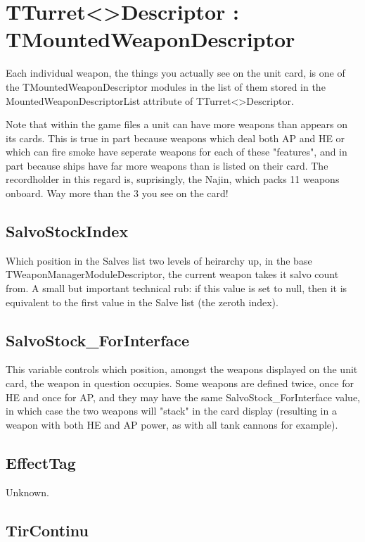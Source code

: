 \documentclass{article}
\begin{document}
\section{TTurret\textless *\textgreater Descriptor : TMountedWeaponDescriptor}

Each individual weapon, the things you actually see on the unit card, is one of the TMountedWeaponDescriptor modules in the list of them stored in the MountedWeaponDescriptorList attribute of TTurret\textless *\textgreater Descriptor.

Note that within the game files a unit can have more weapons than appears on its cards. This is true in part because weapons which deal both AP and HE or which can fire smoke have seperate weapons for each of these "features", and in part because ships have far more weapons than is listed on their card. The recordholder in this regard is, suprisingly, the Najin, which packs 11 weapons onboard. Way more than the 3 you see on the card!

\subsection{SalvoStockIndex}

Which position in the Salves list two levels of heirarchy up, in the base TWeaponManagerModuleDescriptor, the current weapon takes it salvo count from. A small but important technical rub: if this value is set to null, then it is equivalent to the first value in the Salve list (the zeroth index).

\subsection{SalvoStock\_ForInterface}

This variable controls which position, amongst the weapons displayed on the unit card, the weapon in question occupies. Some weapons are defined twice, once for HE and once for AP, and they may have the same SalvoStock\_ForInterface value, in which case the two weapons will "stack" in the card display (resulting in a weapon with both HE and AP power, as with all tank cannons for example).

\subsection{EffectTag}

Unknown.

\subsection{TirContinu}
\end{document}
